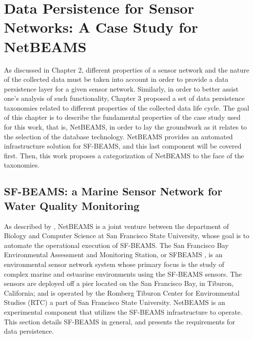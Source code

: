 

\chapter{Data Persistence for Sensor Networks: A Case Study for NetBEAMS}
\label{chap:netbeams-overview}

As discussed in Chapter 2, different properties of a sensor network and the
nature of the collected data must be taken into account in order to provide a
data persistence layer for a given sensor network. Similarly, in order to
better assist one's analysis of such functionality, Chapter 3 proposed a set of
data persistence taxonomies related to different properties of the collected
data life cycle. The goal of this chapter is to describe the fundamental properties 
of the case study used for this work, that is, NetBEAMS, in order to lay the 
groundwork as it relates to the selection of the database technology. NetBEAMS 
provides an automated infrastructure solution for SF-BEAMS, and this last component 
will be covered first. Then, this work proposes a categorization of NetBEAMS to 
the face of the taxonomies.

\section{SF-BEAMS: a Marine Sensor Network for Water Quality Monitoring}

As described by \cite{netbeams2009}, NetBEAMS is a joint venture between the
department of Biology and Computer Science at San Francisco State University,
whose goal is to automate the operational execution of SF-BEAMS. The San Francisco
Bay Environmental Assessment and Monitoring Station, or SFBEAMS \cite{sfbeams2006}, 
is an environmental sensor network system whose primary focus is the study of complex 
marine and estuarine environments using the SF-BEAMS sensors. The sensors are deployed off a
pier located on the San Francisco Bay, in Tiburon, California; and is operated by 
the Romberg Tiburon Center for Environmental Studies (RTC) a part of San Francisco
State University. NetBEAMS is an experimental component that utilizes the SF-BEAMS 
infrastructure to operate. This section details SF-BEAMS in general, and presents 
the requirements for data persistence.


